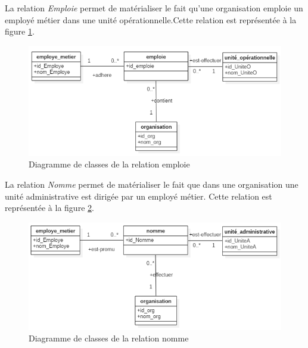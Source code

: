 \label{sectionRelation} 

\label{sectionEmployeUniteO}

La relation \textit{Emploie} permet de matérialiser le fait qu'une organisation emploie un employé métier dans une unité opérationnelle.Cette relation est représentée à la figure \ref{figemploie}.

\begin{figure}[h!]
    \centering
		\includegraphics[scale=0.7]{chap3/images/emploie.png}
    \caption{Diagramme de classes de la relation emploie}
	 \label{figemploie}
\end{figure} 

\label{sectionEmployeUniteA}

La relation \textit{Nomme} permet de matérialiser le fait que dans une organisation une unité administrative est dirigée par un employé métier. Cette relation est représentée à la figure \ref{fignomme}.

\begin{figure}[h!]
    \centering
		\includegraphics[scale=0.7]{chap3/images/nomme.png}
    \caption{Diagramme de classes de la relation nomme}
	 \label{fignomme}
\end{figure} 

\label{sectionUnitéOUniteA}

